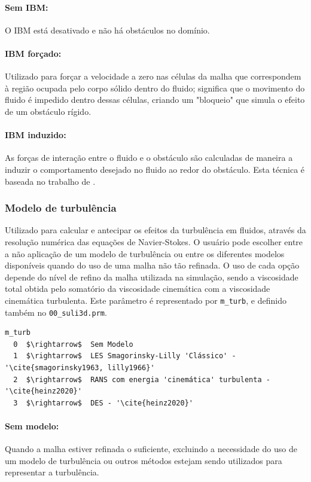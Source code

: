 \documentclass[12pt, a4paper]{article}
\begin{document}
\paragraph{Sem IBM:} O IBM está desativado e não há obstáculos no domínio.
\paragraph{IBM forçado:} Utilizado para forçar a velocidade a zero nas células da malha que correspondem à região ocupada pelo corpo sólido dentro do fluido; significa que o movimento do fluido é impedido dentro dessas células, criando um "bloqueio" que simula o efeito de um obstáculo rígido.
\paragraph{IBM induzido:} As forças de interação entre o fluido e o obstáculo são calculadas de maneira a induzir o comportamento desejado no fluido ao redor do obstáculo. Esta técnica é baseada no trabalho de \cite{auguste2019}.

\subsubsection{Modelo de turbulência}
Utilizado para calcular e antecipar os efeitos da turbulência em fluidos, através da resolução numérica das equações de Navier-Stokes. O usuário pode escolher entre a não aplicação de um modelo de turbulência ou entre os diferentes modelos disponíveis quando do uso de uma malha não tão refinada. O uso de cada opção depende do nível de refino da malha utilizada na simulação, sendo a viscosidade total obtida pelo somatório da viscosidade cinemática com a viscosidade cinemática turbulenta. Este parâmetro é representado por \verb|m_turb|, e definido também no \verb|00_suli3d.prm|.

\begin{lstlisting}[escapeinside='']
m_turb  
  0  $\rightarrow$  Sem Modelo
  1  $\rightarrow$  LES Smagorinsky-Lilly 'Clássico' - '\cite{smagorinsky1963, lilly1966}'
  2  $\rightarrow$  RANS com energia 'cinemática' turbulenta - '\cite{heinz2020}'
  3  $\rightarrow$  DES - '\cite{heinz2020}'
\end{lstlisting}

\paragraph{Sem modelo:} Quando a malha estiver refinada o suficiente, excluindo a necessidade do uso de um modelo de turbulência ou outros métodos estejam sendo utilizados para representar a turbulência.
\end{document}
